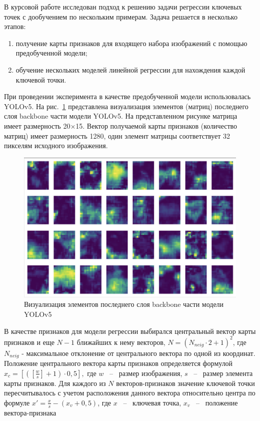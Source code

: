 \documentclass[a4paper,14pt]{article}
\begin{document}
    В курсовой работе исследован подход к решению задачи регрессии ключевых точек с дообучением по нескольким примерам.
    Задача решается в несколько этапов:
    \begin{enumerate}
        [1)]
        \itemsep0em
        \item получение карты признаков для входящего набора изображений с помощью предобученной модели;
        \item обучение нескольких моделей линейной регрессии для нахождения каждой ключевой точки.
    \end{enumerate}
    При проведении эксперимента в качестве предобученной модели использовалась YOLOv5.
    На рис.~\ref{fig:stage9_SPPF_features} представлена визуализация элементов (матриц) последнего слоя backbone части модели YOLOv5. На представленном рисунке матрица имеет размерность 20×15. Вектор получаемой карты признаков (количество матриц) имеет размерность 1280, один элемент матрицы соответствует 32 пикселям исходного изображения.
    \begin{figure}[H]
        \centering
        \includegraphics[width=0.7\linewidth]{images/stage9_SPPF_features}
        \caption{Визуализация элементов последнего слоя backbone части модели YOLOv5}
        \label{fig:stage9_SPPF_features}
    \end{figure}

    В качестве признаков для модели регрессии выбирался центральный вектор карты признаков и еще $N - 1$ ближайших к нему векторов, $N = (N_{neig} \cdot 2 + 1)^2$, где $N_{neig}$ - максимальное отклонение от центрального вектора по одной из координат.
    Положение центрального вектора карты признаков определяется формулой $x_c =\left[\left( [\frac{w}{s}]+1\right) \cdot 0,5\right],$ где $w$ ~--~ размер изображения, $s$ ~--~ размер элемента карты признаков.
    Для каждого из $N$ векторов-признаков значение ключевой точки пересчитывалось с учетом расположения данного вектора относительно центра по формуле $x' = \frac{x}{s} - (x_v + 0,5)$, где $x$ ~--~ ключевая точка, $x_v$ ~--~ положение вектора-признака
\end{document}

